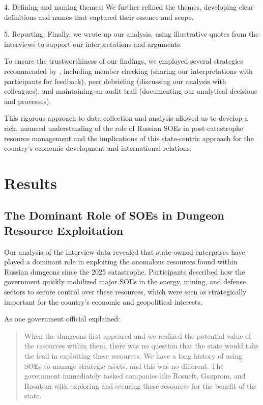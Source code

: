 \documentclass[12pt, a4paper]{article}
\begin{document}
4. Defining and naming themes: We further refined the themes, developing clear definitions and names that captured their essence and scope.

5. Reporting: Finally, we wrote up our analysis, using illustrative quotes from the interviews to support our interpretations and arguments.

To ensure the trustworthiness of our findings, we employed several strategies recommended by \cite{Lincoln1985}, including member checking (sharing our interpretations with participants for feedback), peer debriefing (discussing our analysis with colleagues), and maintaining an audit trail (documenting our analytical decisions and processes).

This rigorous approach to data collection and analysis allowed us to develop a rich, nuanced understanding of the role of Russian SOEs in post-catastrophe resource management and the implications of this state-centric approach for the country's economic development and international relations.

\section{Results}

\subsection{The Dominant Role of SOEs in Dungeon Resource Exploitation}
Our analysis of the interview data revealed that state-owned enterprises have played a dominant role in exploiting the anomalous resources found within Russian dungeons since the 2025 catastrophe. Participants described how the government quickly mobilized major SOEs in the energy, mining, and defense sectors to secure control over these resources, which were seen as strategically important for the country's economic and geopolitical interests.

As one government official explained:

\begin{quote}
When the dungeons first appeared and we realized the potential value of the resources within them, there was no question that the state would take the lead in exploiting these resources. We have a long history of using SOEs to manage strategic assets, and this was no different. The government immediately tasked companies like Rosneft, Gazprom, and Rosatom with exploring and securing these resources for the benefit of the state.
\end{quote}
\end{document}
